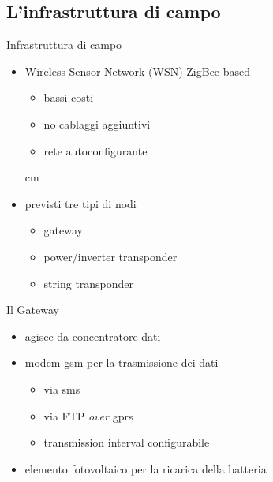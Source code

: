 \documentclass{beamer}
\newcommand{\N}{\vskip 0.3 cm}
\newcommand{\red}[1]{\textcolor[rgb]{.8,0,0}{#1}}
\newcommand{\green}[1]{\textcolor[rgb]{0,.6,.1}{#1}}
\begin{document}
%
\subsection{L'infrastruttura di campo}
\begin{frame}{Infrastruttura di campo}
%
\begin{itemize}
  \item \red{Wireless Sensor Network} (WSN) ZigBee-based
    \begin{itemize}
    \item bassi costi
    \item no cablaggi aggiuntivi
    \item rete autoconfigurante
    \end{itemize}
    \N
  \item previsti tre tipi di nodi
    \begin{itemize}
    \item \red{gateway}
    \item \red{power/inverter transponder}
    \item \red{string transponder}
    \end{itemize}
\end{itemize}
%
\end{frame}
%

%
\begin{frame}{Il Gateway}
\begin{figure}[!h]
  \begin{center}
  \end{center}
\end{figure}
%
\begin{itemize}
  \item agisce da \red{concentratore dati}
  \item \red{modem gsm} per la trasmissione dei dati
    \begin{itemize}
    \item via \green{sms}
    \item via \green{FTP} \emph{over} \green{gprs}
    \item \red{transmission interval} configurabile
      \end{itemize}
  \item \red{elemento fotovoltaico} per la ricarica della batteria
\end{itemize}
%
\end{frame}
%
\end{document}
